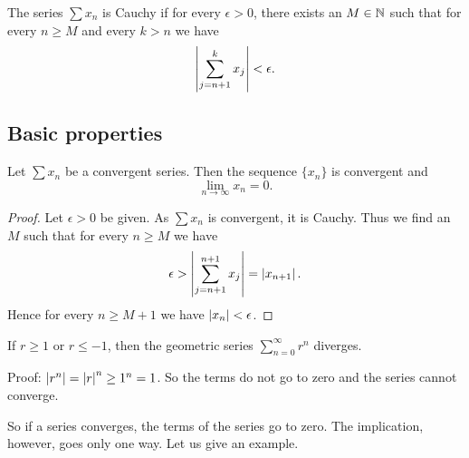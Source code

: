 \begin{prop} \label{prop:cachyser}
The series $\sum x_n$ is Cauchy if for every $\epsilon > 0$, 
there exists an $M \in {\mathbb{N}}$ such that for every $n \geq M$
and every $k > n$ we have
\begin{equation*}
\left\lvert { \sum_{j={n+1}}^k x_j } \right\rvert
< \epsilon .
\end{equation*}
\end{prop}

\subsection{Basic properties}

\begin{prop}
Let $\sum x_n$ be a convergent series.  Then
the sequence $\{ x_n \}$ is convergent and
\begin{equation*}
\lim_{n\to\infty} x_n = 0.
\end{equation*}
\end{prop}

\begin{proof}
Let $\epsilon > 0$ be given.  As $\sum x_n$ is convergent, it is Cauchy.
Thus we find an $M$ such that for every $n \geq M$ we have
\begin{equation*}
\epsilon > 
\left\lvert { \sum_{j={n+1}}^{n+1} x_j } \right\rvert
=
\left\lvert { x_{n+1} } \right\rvert .
\end{equation*}
Hence for every $n \geq M+1$ we have $\left\lvert {x_{n}} \right\rvert < \epsilon$.
\end{proof}

\begin{example}
If $r \geq 1$ or $r \leq -1$, then the geometric series $\sum_{n=0}^\infty r^n$
diverges.

Proof: $\left\lvert {r^n} \right\rvert = \left\lvert {r} \right\rvert^n \geq 1^n = 1$.  So the terms do not go to zero
and the series cannot converge.
\end{example}

So if a series converges, the terms of the series go to zero.
The implication, however, goes only one way.
Let us give an example.

